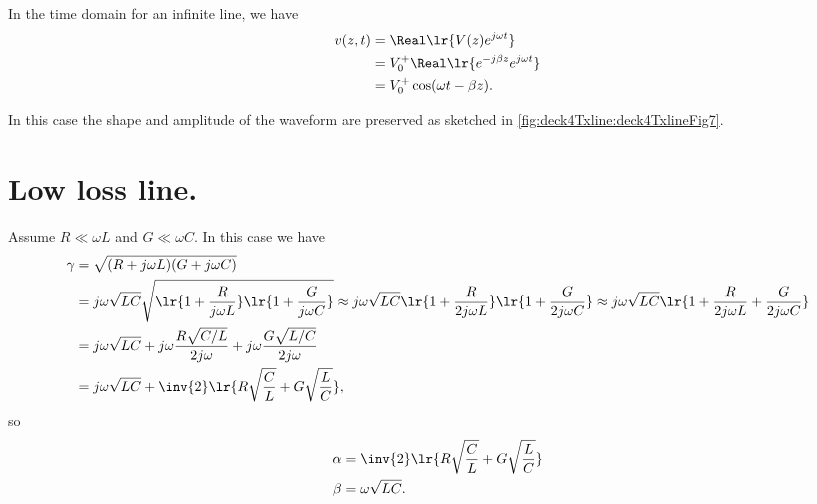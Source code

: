In the time domain for an infinite line, we have
\begin{equation}\label{eqn:uwaves4TransmissionLines:620}
\begin{aligned}
v(z, t)
&= \Real\lr{ V(z) e^{j \omega t} }
\\ &= V_0^{+} \Real\lr{ e^{-j \beta z} e^{j \omega t} }
\\ &= V_0^{+} \cos( \omega t - \beta z ).
\end{aligned}
\end{equation}

In this case the shape and amplitude of the waveform are preserved as sketched in \cref{fig:deck4Txline:deck4TxlineFig7}.
\section{Low loss line.}
Assume \( R \ll \omega L \) and \( G \ll \omega C \).  In this case we have
\begin{equation}\label{eqn:uwaves4TransmissionLines:640}
\begin{aligned}
\gamma
&= \sqrt{ (R + j \omega L) ( G + j \omega C ) }
\\ &=
j \omega \sqrt{L C} \sqrt{
\lr{ 1 + \frac{R}{j\omega L} }
\lr{ 1 + \frac{G}{j\omega C} }
}
\approx
j \omega \sqrt{L C}
\lr{ 1 + \frac{R}{2 j\omega L} }
\lr{ 1 + \frac{G}{2 j\omega C} }
\approx
j \omega \sqrt{L C}
\lr{ 1 + \frac{R}{2 j\omega L}  + \frac{G}{2 j\omega C} }
\\ &=
j \omega \sqrt{L C}
+ j \omega \frac{R \sqrt{C/L}}{2 j\omega}
+ j \omega \frac{G \sqrt{L/C}}{2 j\omega}
\\ &=
j \omega \sqrt{L C}
+
\inv{2} \lr{
R \sqrt{\frac{C}{L}}
+
G \sqrt{\frac{L}{C}}
},
\end{aligned}
\end{equation}
so
\begin{equation}\label{eqn:uwaves4TransmissionLines:660}
\begin{aligned}
\alpha &=
\inv{2} \lr{
R \sqrt{\frac{C}{L}}
+
G \sqrt{\frac{L}{C}}
} \\
\beta &= \omega \sqrt{L C}.
\end{aligned}
\end{equation}

